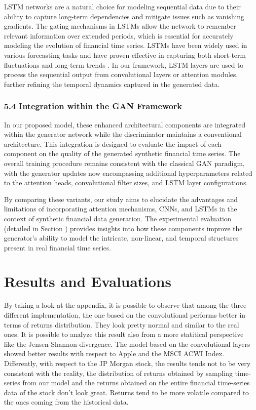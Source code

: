 \documentclass{article}
\begin{document}
LSTM networks are a natural choice for modeling sequential data due to their ability to capture long-term dependencies and mitigate issues such as vanishing gradients. The gating mechanisms in LSTMs allow the network to remember relevant information over extended periods, which is essential for accurately modeling the evolution of financial time series. LSTMs have been widely used in various forecasting tasks and have proven effective in capturing both short-term fluctuations and long-term trends . In our framework, LSTM layers are used to process the sequential output from convolutional layers or attention modules, further refining the temporal dynamics captured in the generated data.

\subsubsection*{5.4 Integration within the GAN Framework}

In our proposed model, these enhanced architectural components are integrated within the generator network while the discriminator maintains a conventional architecture. This integration is designed to evaluate the impact of each component on the quality of the generated synthetic financial time series. The overall training procedure remains consistent with the classical GAN paradigm, with the generator updates now encompassing additional hyperparameters related to the attention heads, convolutional filter sizes, and LSTM layer configurations.

By comparing these variants, our study aims to elucidate the advantages and limitations of incorporating attention mechanisms, CNNs, and LSTMs in the context of synthetic financial data generation. The experimental evaluation (detailed in Section ) provides insights into how these components improve the generator's ability to model the intricate, non-linear, and temporal structures present in real financial time series.

\section{Results and Evaluations}

By taking a look at the appendix, it is possible to observe that among the three different implementation, the one based on the convolutional performs better in terms of returns distribution. They look pretty normal and similar to the real ones. It is possible to analyze this result also from a more statitical perspective like the Jensen-Shannon divergence. The model based on the convolutional layers showed better results with respect to Apple and the MSCI ACWI Index. Differently, with respect to the JP Morgan stock, the results tends not to be very consistent with the reality, the distribution of returns obtained by sampling time-series from our model and the returns obtained on the entire financial time-series data of the stock don't look great. Returns tend to be more volatile compared to the ones coming from the historical data.
\end{document}

